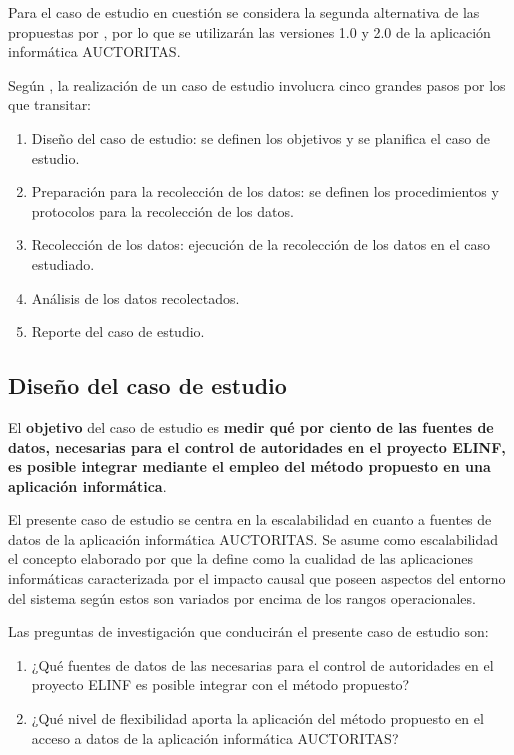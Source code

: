 Para el caso de estudio en cuestión se considera la segunda alternativa de las propuestas por \cite{kitchenham1995case}, por lo que se utilizarán las versiones 1.0 y 2.0 de la aplicación informática AUCTORITAS.

Según \cite{Wohlin2012}, la realización de un caso de estudio involucra cinco grandes pasos por los que transitar:

\begin{enumerate}
\item Diseño del caso de estudio: se definen los objetivos y se planifica el caso de estudio.
\item Preparación para la recolección de los datos: se definen los procedimientos y protocolos para la recolección de los datos.
\item Recolección de los datos: ejecución de la recolección de los datos en el caso estudiado.
\item Análisis de los datos recolectados.
\item Reporte del caso de estudio.
\end{enumerate}

\subsection{Diseño del caso de estudio}
El \textbf{objetivo} del caso de estudio es \textbf{medir qué por ciento de las fuentes de datos, necesarias para el control de autoridades en el proyecto ELINF, es posible integrar mediante el empleo del método propuesto en una aplicación informática}. 

El presente caso de estudio se centra en la escalabilidad en cuanto a fuentes de datos de la aplicación informática AUCTORITAS. Se asume como escalabilidad el concepto elaborado por \cite{duboc2006framework} que la define como la cualidad de las aplicaciones informáticas caracterizada por el impacto causal que poseen aspectos del entorno del sistema según estos son variados por encima de los rangos operacionales.

Las preguntas de investigación que conducirán el presente caso de estudio son:

\begin{enumerate}
\item ¿Qué fuentes de datos de las necesarias para el control de autoridades en el proyecto ELINF es posible integrar con el método propuesto?
\item ¿Qué nivel de flexibilidad aporta la aplicación del método propuesto en el acceso a datos de la aplicación informática AUCTORITAS?
\end{enumerate}


